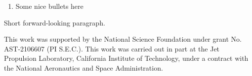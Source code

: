 \documentclass[twocolumn]{aastex631}
\begin{document}
\begin{enumerate}
    \item Some nice bullets here
\end{enumerate}

Short forward-looking paragraph.

\begin{acknowledgments}

This work was supported by the National Science Foundation under grant No. AST-2106607 (PI S.E.C.). This work was carried out in part at the Jet Propulsion Laboratory, California Institute of Technology, under a contract with the National Aeronautics and Space Administration.

\end{acknowledgments}


\end{document}
